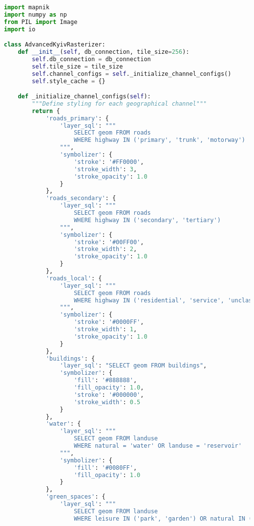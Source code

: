 \begin{lstlisting}[language=Python, caption=Comprehensive Rasterization System]
import mapnik
import numpy as np
from PIL import Image
import io

class AdvancedKyivRasterizer:
    def __init__(self, db_connection, tile_size=256):
        self.db_connection = db_connection
        self.tile_size = tile_size
        self.channel_configs = self._initialize_channel_configs()
        self.style_cache = {}

    def _initialize_channel_configs(self):
        """Define styling for each geographical channel"""
        return {
            'roads_primary': {
                'layer_sql': """
                    SELECT geom FROM roads
                    WHERE highway IN ('primary', 'trunk', 'motorway')
                """,
                'symbolizer': {
                    'stroke': '#FF0000',
                    'stroke_width': 3,
                    'stroke_opacity': 1.0
                }
            },
            'roads_secondary': {
                'layer_sql': """
                    SELECT geom FROM roads
                    WHERE highway IN ('secondary', 'tertiary')
                """,
                'symbolizer': {
                    'stroke': '#00FF00',
                    'stroke_width': 2,
                    'stroke_opacity': 1.0
                }
            },
            'roads_local': {
                'layer_sql': """
                    SELECT geom FROM roads
                    WHERE highway IN ('residential', 'service', 'unclassified')
                """,
                'symbolizer': {
                    'stroke': '#0000FF',
                    'stroke_width': 1,
                    'stroke_opacity': 1.0
                }
            },
            'buildings': {
                'layer_sql': "SELECT geom FROM buildings",
                'symbolizer': {
                    'fill': '#888888',
                    'fill_opacity': 1.0,
                    'stroke': '#000000',
                    'stroke_width': 0.5
                }
            },
            'water': {
                'layer_sql': """
                    SELECT geom FROM landuse
                    WHERE natural = 'water' OR landuse = 'reservoir'
                """,
                'symbolizer': {
                    'fill': '#0080FF',
                    'fill_opacity': 1.0
                }
            },
            'green_spaces': {
                'layer_sql': """
                    SELECT geom FROM landuse
                    WHERE leisure IN ('park', 'garden') OR natural IN ('forest', 'wood')

\end{lstlisting}

